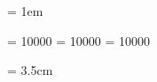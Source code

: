 



\emergencystretch = 1em

\makeatletter
\def\@textbottom{\vskip \z@ \@plus 12pt}
\let\@texttop\relax
\makeatother

\clubpenalty = 10000
\displaywidowpenalty = 10000
\widowpenalty = 10000

\cfoot*{\pagemark}
\ofoot*{}

\renewcommand*{\thefootnote}{\fnsymbol{footnote}}


\newtheorem{definition}{Definition}[chapter]
\theoremstyle{definition}

\DeclarePairedDelimiter{\abs}{\lvert}{\rvert}

\tymin = 3.5cm

\newcommand*{\boldname}[3]{%
  \def\lastname{#1}%
  \def\firstname{#2}%
  \def\firstinit{#3}%
}
\renewcommand{\mkbibnamegiven}[1]{%
  \ifboolexpr{
    (test {\ifdefequal{\firstname}{\namepartgiven}} or
     test {\ifdefequal{\firstinit}{\namepartgiven}}) and
    test {\ifdefequal{\lastname}{\namepartfamily}}
  }{\mkbibbold{#1}}{#1}%
}
\renewcommand{\mkbibnamefamily}[1]{%
  \ifboolexpr{
    (test {\ifdefequal{\firstname}{\namepartgiven}} or
     test {\ifdefequal{\firstinit}{\namepartgiven}}) and
    test {\ifdefequal{\lastname}{\namepartfamily}}
  }{\mkbibbold{#1}}{#1}%
}

\setdisplayskipstretch{}

\makeatletter
{}
\newcommand*{\org@overidelabel}{} %
\let\org@overridelabel\@verridelabel
\renewcommand*{\@verridelabel}[1]{%
  \@bsphack%
  \protected@write\@auxout{}{\string\AC@undonewlabel{#1@cref}}%
  \org@overridelabel{#1}%
  \@esphack%
}%
\makeatother
\renewcommand{\aclabelfont}[1]{\textrm{#1}} %


